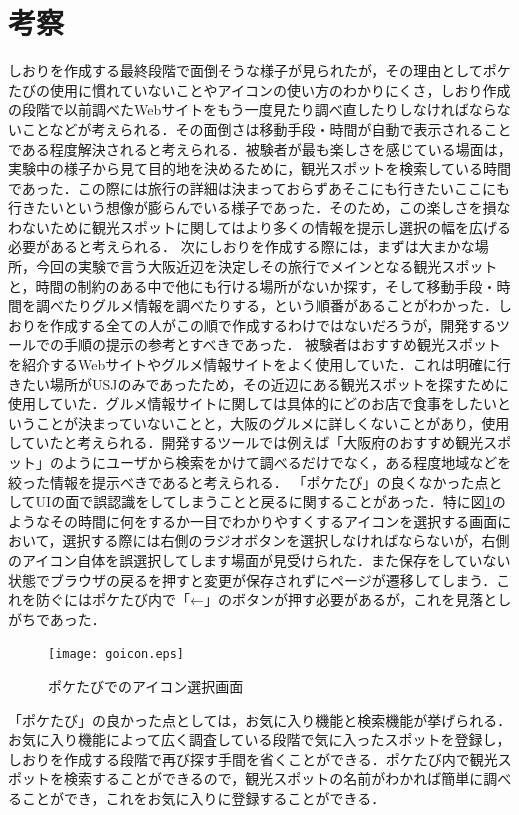 \documentclass{funthesis}
\begin{document}
\section{考察}
しおりを作成する最終段階で面倒そうな様子が見られたが，その理由としてポケたびの使用に慣れていないことやアイコンの使い方のわかりにくさ，しおり作成の段階で以前調べたWebサイトをもう一度見たり調べ直したりしなければならないことなどが考えられる．その面倒さは移動手段・時間が自動で表示されることである程度解決されると考えられる．被験者が最も楽しさを感じている場面は，実験中の様子から見て目的地を決めるために，観光スポットを検索している時間であった．この際には旅行の詳細は決まっておらずあそこにも行きたいここにも行きたいという想像が膨らんでいる様子であった．そのため，この楽しさを損なわないために観光スポットに関してはより多くの情報を提示し選択の幅を広げる必要があると考えられる．
次にしおりを作成する際には，まずは大まかな場所，今回の実験で言う大阪近辺を決定しその旅行でメインとなる観光スポットと，時間の制約のある中で他にも行ける場所がないか探す，そして移動手段・時間を調べたりグルメ情報を調べたりする，という順番があることがわかった．しおりを作成する全ての人がこの順で作成するわけではないだろうが，開発するツールでの手順の提示の参考とすべきであった．
被験者はおすすめ観光スポットを紹介するWebサイトやグルメ情報サイトをよく使用していた．これは明確に行きたい場所がUSJのみであったため，その近辺にある観光スポットを探すために使用していた．グルメ情報サイトに関しては具体的にどのお店で食事をしたいということが決まっていないことと，大阪のグルメに詳しくないことがあり，使用していたと考えられる．開発するツールでは例えば「大阪府のおすすめ観光スポット」のようにユーザから検索をかけて調べるだけでなく，ある程度地域などを絞った情報を提示べきであると考えられる．
「ポケたび」の良くなかった点としてUIの面で誤認識をしてしまうことと戻るに関することがあった．特に図\ref{Lgoicon}のようなその時間に何をするか一目でわかりやすくするアイコンを選択する画面において，選択する際には右側のラジオボタンを選択しなければならないが，右側のアイコン自体を誤選択してします場面が見受けられた．また保存をしていない状態でブラウザの戻るを押すと変更が保存されずにページが遷移してしまう．これを防ぐにはポケたび内で「←」のボタンが押す必要があるが，これを見落としがちであった．
\begin{figure}[htpb]
\begin{center}
\texttt{[image: goicon.eps]}
\end{center}
\caption{ポケたびでのアイコン選択画面}
\label{Lgoicon}
\end{figure}

「ポケたび」の良かった点としては，お気に入り機能と検索機能が挙げられる．お気に入り機能によって広く調査している段階で気に入ったスポットを登録し，しおりを作成する段階で再び探す手間を省くことができる．ポケたび内で観光スポットを検索することができるので，観光スポットの名前がわかれば簡単に調べることができ，これをお気に入りに登録することができる．
\end{document}
